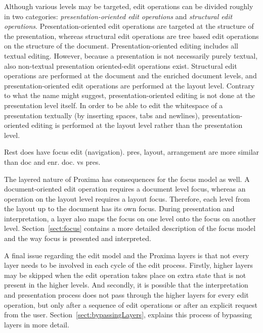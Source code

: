 \bc
Although various levels may be targeted, edit operations can be divided roughly in two categories: {\em presentation-oriented edit operations} and {\em structural edit operations}. Presentation-oriented edit operations are targeted at the structure of the presentation, whereas structural edit operations are tree based edit operations on the structure of the document.  Presentation-oriented editing includes all textual editing. However, because a presentation is not necessarily purely textual, also non-textual presentation oriented-edit operations exist. Structural edit operations are performed at the document and the enriched document levels, and presentation-oriented edit operations are performed at the layout level. Contrary to what the name might suggest, presentation-oriented editing is not done at the presentation level itself. In order to be able to edit the whitespace of a presentation textually (by inserting spaces, tabs and newlines), presentation-oriented editing is performed at the layout level rather than the presentation level. 
\ec

\bc
Rest does have focus edit (navigation). pres, layout, arrangement are more similar than doc  and enr.
doc. vs pres.
\ec

The layered nature of Proxima has consequences for the focus model as well. A document-oriented edit operation requires a document level focus, whereas an operation on the layout level requires a layout focus. Therefore, each level from the layout up to the document has its own focus. During presentation and interpretation, a layer also maps the focus on one level onto the focus on another level. Section~\ref{sect:focus} contains a more detailed description of the focus model and the way focus is presented and interpreted.

A final issue regarding the edit model and the Proxima layers is that not every layer needs to be involved in each cycle of the edit process. Firstly, higher layers may be skipped when the edit operation takes place on extra state that is not present in the higher levels. And secondly, it is possible that the interpretation and presentation process does not pass through the higher layers for every edit operation, but only after a sequence of edit operations or after an explicit request from the user. Section~\ref{sect:bypassingLayers}, explains this process of bypassing layers in more detail.

